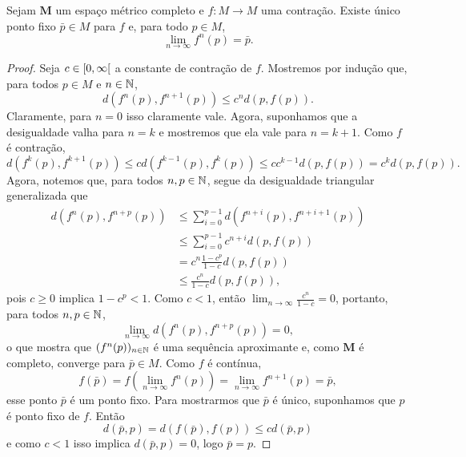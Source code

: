 \begin{proposition}
Sejam $\bm M$ um espaço métrico completo e $f\colon M \to M$ uma contração. Existe único ponto fixo $\bar p \in M$ para $f$ e, para todo $p \in M$,
	\begin{equation*}
	\lim_{n \to \infty} f^n(p) = \bar p.
	\end{equation*}
\end{proposition}
\begin{proof}
Seja $c \in \left[{0},{\infty}\right[$ a constante de contração de $f$. Mostremos por indução que, para todos $p \in M$ e $n \in \mathbb{N}$,
	\begin{equation*}
	d(f^n(p),f^{n+1}(p)) \leq c^n d(p,f(p)).
	\end{equation*}
Claramente, para $n=0$ isso claramente vale. Agora, suponhamos que a desigualdade valha para $n=k$ e mostremos que ela vale para $n=k+1$. Como $f$ é contração,
	\begin{equation*}
	d(f^k(p),f^{k+1}(p)) \leq c d(f^{k-1}(p),f^k(p)) \leq c c^{k-1} d(p,f(p)) = c^k d(p,f(p)).
	\end{equation*}
Agora, notemos que, para todos $n,p \in \mathbb{N}$, segue da desigualdade triangular generalizada que
	\begin{align*}
	d(f^n(p),f^{n+p}(p)) &\leq \sum_{i=0}^{p-1} d(f^{n+i}(p),f^{n+i+1}(p)) \\
		&\leq \sum_{i=0}^{p-1} c^{n+i} d(p,f(p)) \\
		&= c^n\frac{1-c^p}{1-c} d(p,f(p)) \\
		&\leq \frac{c^n}{1-c} d(p,f(p)),
	\end{align*}
pois $c\geq 0$ implica $1-c^p<1$. Como $c<1$, então $\lim_{n \to \infty} \frac{c^n}{1-c} = 0$, portanto, para todos $n,p \in \mathbb{N}$,
	\begin{equation*}
	\lim_{n \to \infty} d(f^n(p),f^{n+p}(p)) = 0,
	\end{equation*}
o que mostra que $(f^n(p))_{n \in \mathbb{N}}$ é uma sequência aproximante e, como $\bm M$ é completo, converge para $\bar p \in M$. Como $f$ é contínua,
	\begin{equation*}
	f(\bar p) = f\left(\lim_{n \to \infty} f^n(p)\right) = \lim_{n \to \infty} f^{n+1}(p) = \bar p,
	\end{equation*}
esse ponto $\bar p$ é um ponto fixo. Para mostrarmos que $\bar p$ é único, suponhamos que $p$ é ponto fixo de $f$. Então
	\begin{equation*}
	d(\bar p,p) = d(f(\bar p),f(p)) \leq c d(\bar p,p)
	\end{equation*}
e como $c<1$ isso implica $d(\bar p,p)=0$, logo $\bar p=p$.
\end{proof}

